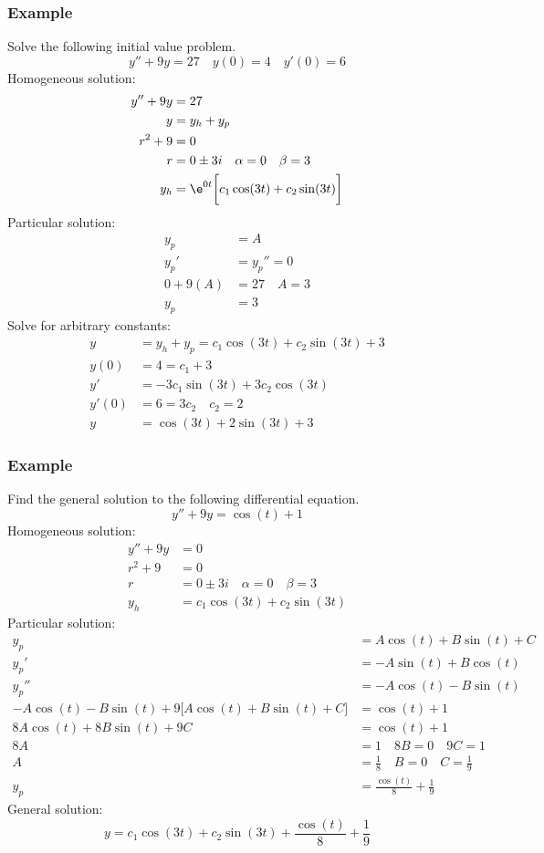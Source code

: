 \documentclass{math}
\begin{document}
\subsubsection*{Example}
Solve the following initial value problem.
\[ y''+9y = 27 \quad y(0) = 4 \quad y'(0) = 6 \]
Homogeneous solution:
\begin{align*}
  y''+9y &= 27 \\
  y &= y_h+y_p \\
  r^2+9 &= 0 \\
  r &= 0\pm3i \quad \alpha = 0 \quad \beta = 3 \\
  y_h &= \e^{0t}\bigg[c_1\cos(3t)+c_2\sin(3t)\bigg]
\end{align*}
Particular solution:
\begin{align*}
  y_p &= A \\
  y_p' &= y_p'' = 0 \\
  0+9(A) &= 27 \quad A = 3 \\
  y_p &= 3
\end{align*}
Solve for arbitrary constants:
\begin{align*}
  y &= y_h+y_p = c_1\cos(3t)+c_2\sin(3t)+3 \\
  y(0) &= 4 = c_1+3 \\
  y' &= -3c_1\sin(3t)+3c_2\cos(3t) \\
  y'(0) &= 6 = 3c_2 \quad c_2 = 2 \\
  y &= \cos(3t)+2\sin(3t)+3
\end{align*}

\subsubsection*{Example}
Find the general solution to the following differential equation.
\[ y''+9y = \cos(t)+1 \]
Homogeneous solution:
\begin{align*}
  y''+9y &= 0 \\
  r^2+9 &= 0 \\
  r &= 0\pm3i \quad \alpha = 0 \quad \beta = 3 \\
  y_h &= c_1\cos(3t)+c_2\sin(3t)
\end{align*}
Particular solution:
\begin{align*}
  y_p &= A\cos(t)+B\sin(t)+C \\
  y_p' &= -A\sin(t)+B\cos(t) \\
  y_p'' &= -A\cos(t)-B\sin(t) \\
  -A\cos(t)-B\sin(t)+9\bigg[A\cos(t)+B\sin(t)+C\bigg] &= \cos(t)+1 \\
  8A\cos(t)+8B\sin(t)+9C &= \cos(t)+1 \\
  8A &= 1 \quad 8B = 0 \quad 9C = 1 \\
  A &= \frac{1}{8} \quad B = 0 \quad C = \frac{1}{9} \\
  y_p &= \frac{\cos(t)}{8}+\frac{1}{9}
\end{align*}
General solution:
\[ y = c_1\cos(3t)+c_2\sin(3t)+\frac{\cos(t)}{8}+\frac{1}{9} \]
\end{document}

